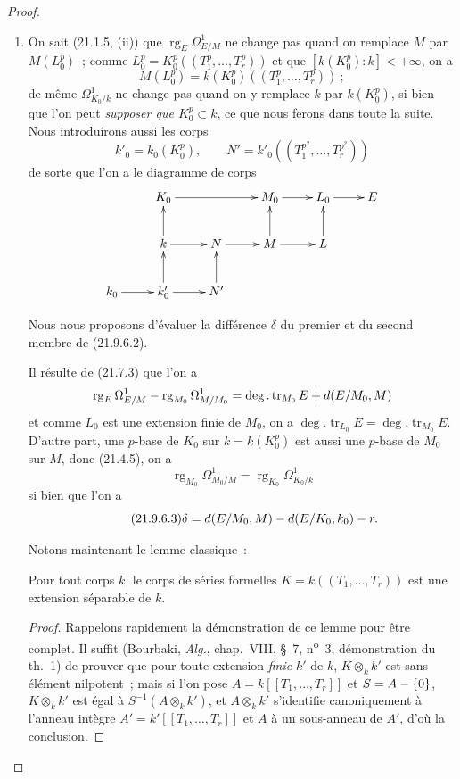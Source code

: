 \begin{proof}
\begin{enumerate}
  \item[(i)] On sait (21.1.5, (ii)) que
  $\operatorname{rg}_E\Omega^1_{E/M}$ ne change pas quand on remplace $M$ par
  $M(L_0^p)$~; comme
  $L_0^p=K_0^p((T_1^p,\ldots,T_r^p))$ et que
  $[k(K_0^p):k]<+\infty$, on a
  \[
    M(L_0^p)=k(K_0^p)((T_1^p,\ldots,T_r^p))~;
  \]
  de même $\Omega^1_{K_0/k}$ ne change pas quand on y remplace $k$ par
  $k(K_0^p)$, si bien que l'on peut \emph{supposer que $K_0^p\subset k$}, ce
  que nous ferons dans toute la suite. Nous introduirons aussi les corps
  \[
    k'_0=k_0(K_0^p),\qquad
    N'=k'_0((T_1^{p^2},\ldots,T_r^{p^2}))
  \]
  de sorte que l'on a le diagramme de corps
  \[
    \xymatrix{
      & K_0\ar[rr] & & M_0\ar[r] & L_0\ar[r] & E\\
      & k\ar[u]\ar[r] & N\ar[r] & M\ar[u]\ar[r] & L\ar[u]\\
      k_0\ar[r] & k'_0\ar[u]\ar[r] & N'\ar[u]
    }
  \]

  Nous nous proposons d'évaluer la différence $\delta$ du premier et du
  second membre de (21.9.6.2).

  Il résulte de (21.7.3) que l'on a
  \[
    \operatorname{rg}_E\Omega^1_{E/M}
    -\operatorname{rg}_{M_0}\Omega^1_{M/M_0}
    =\deg.\operatorname{tr}_{M_0}E+d(E/M_0,M)
  \]
  et comme $L_0$ est une extension finie de $M_0$, on a
  $\deg.\operatorname{tr}_{L_0}E=\deg.\operatorname{tr}_{M_0}E$. D'autre
  part, une $p$-base de $K_0$ sur $k=k(K_0^p)$ est aussi une $p$-base de
  $M_0$ sur $M$, donc (21.4.5), on a
  \[
    \operatorname{rg}_{M_0}\Omega^1_{M_0/M}
    =\operatorname{rg}_{K_0}\Omega^1_{K_0/k}
  \]
  si bien que l'on a
  \begin{equation}
  \tag{21.9.6.3}
  \label{0.21.9.6.3-fr}
    \delta=d(E/M_0,M)- d(E/K_0,k_0)- r.
  \end{equation}

  Notons maintenant le lemme classique~:

  \begin{lemma}[21.9.6.4]
  \label{0.21.9.6.4-fr}
  Pour tout corps $k$, le corps de séries formelles
  $K=k((T_1,\ldots,T_r))$ est une extension séparable de $k$.
  \end{lemma}

  \begin{proof}
  Rappelons rapidement la démonstration de ce lemme pour être complet. Il
  suffit (Bourbaki, \emph{Alg.}, chap.~VIII, \S~7,
  n\textsuperscript{o}~3, démonstration du th.~1) de prouver que pour toute
  extension \emph{finie} $k'$ de $k$, $K\otimes_k k'$ est sans élément nilpotent~;
  mais si l'on pose $A=k[[T_1,\ldots,T_r]]$ et $S=A-\{0\}$,
  $K\otimes_k k'$ est égal à $S^{-1}(A\otimes_k k')$, et
  $A\otimes_k k'$ s'identifie canoniquement à l'anneau intègre
  $A'=k'[[T_1,\ldots,T_r]]$ et $A$ à un sous-anneau de $A'$, d'où la
  conclusion.
  \end{proof}


\end{enumerate}
\end{proof}

